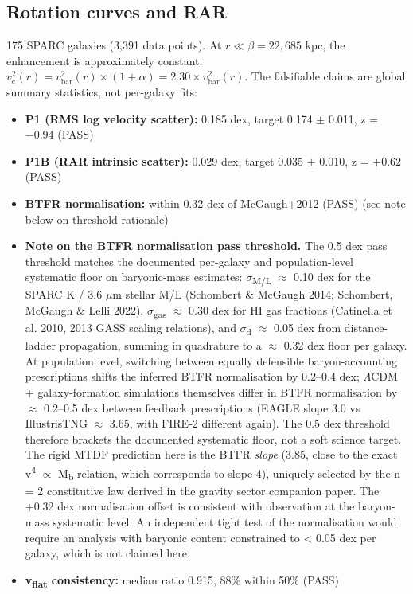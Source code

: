\documentclass[11pt,a4paper]{article}
\begin{document}
\subsection{Rotation curves and RAR}
175 SPARC galaxies (3,391 data points). At $r \ll \beta = 22{,}685$ kpc, the enhancement is approximately constant: $v_c^2(r) = v_\text{bar}^2(r) \times (1 + \alpha) = 2.30 \times v_\text{bar}^2(r)$. The falsifiable claims are global summary statistics, not per-galaxy fits:

\begin{itemize}
  \item \textbf{P1 (RMS log velocity scatter):} 0.185 dex, target 0.174 $\pm$ 0.011, z = $-0.94$ (PASS)
  \item \textbf{P1B (RAR intrinsic scatter):} 0.029 dex, target 0.035 $\pm$ 0.010, z = $+0.62$ (PASS)
  \item \textbf{BTFR normalisation:} within 0.32 dex of McGaugh+2012 (PASS) {\small (see note below on threshold rationale)}
  \item \textbf{Note on the BTFR normalisation pass threshold.} The 0.5 dex pass threshold matches the documented per-galaxy and population-level systematic floor on baryonic-mass estimates: $\sigma$\textsubscript{M/\allowbreak{}L} $\approx$ 0.10 dex for the SPARC K / 3.6 $\mu$m stellar M/\allowbreak{}L (Schombert \& McGaugh 2014; Schombert, McGaugh \& Lelli 2022), $\sigma$\textsubscript{gas} $\approx$ 0.30 dex for HI gas fractions (Catinella et al. 2010, 2013 GASS scaling relations), and $\sigma$\textsubscript{d} $\approx$ 0.05 dex from distance-ladder propagation, summing in quadrature to a $\approx$ 0.32 dex floor per galaxy. At population level, switching between equally defensible baryon-accounting prescriptions shifts the inferred BTFR normalisation by 0.2--0.4 dex; $\Lambda$CDM + galaxy-formation simulations themselves differ in BTFR normalisation by $\approx$ 0.2--0.5 dex between feedback prescriptions (EAGLE slope 3.0 vs IllustrisTNG $\approx$ 3.65, with FIRE-2 different again). The 0.5 dex threshold therefore brackets the documented systematic floor, not a soft science target. The rigid MTDF prediction here is the BTFR \emph{slope} (3.85, close to the exact v\textsuperscript{4} $\propto$ M\textsubscript{b} relation, which corresponds to slope 4), uniquely selected by the n = 2 constitutive law derived in the gravity sector companion paper. The +0.32 dex normalisation offset is consistent with observation at the baryon-mass systematic level. An independent tight test of the normalisation would require an analysis with baryonic content constrained to < 0.05 dex per galaxy, which is not claimed here.
  \item \textbf{v\textsubscript{flat} consistency:} median ratio 0.915, 88\% within 50\% (PASS)
\end{itemize}
\end{document}
